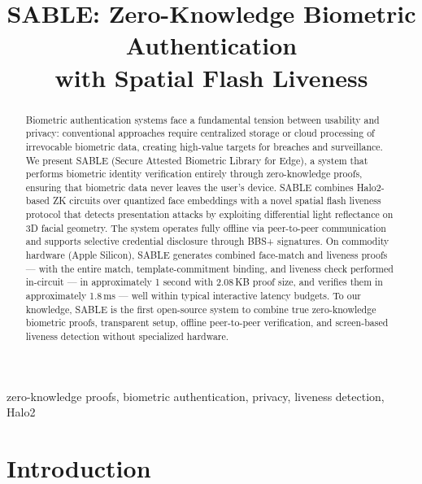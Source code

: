 \documentclass[conference]{IEEEtran}
\begin{document}
\title{SABLE: Zero-Knowledge Biometric Authentication\\with Spatial Flash Liveness}

\author{
}

\maketitle

\begin{abstract}
Biometric authentication systems face a fundamental tension between usability and privacy: conventional approaches require centralized storage or cloud processing of irrevocable biometric data, creating high-value targets for breaches and surveillance. We present SABLE (Secure Attested Biometric Library for Edge), a system that performs biometric identity verification entirely through zero-knowledge proofs, ensuring that biometric data never leaves the user's device. SABLE combines Halo2-based ZK circuits over quantized face embeddings with a novel spatial flash liveness protocol that detects presentation attacks by exploiting differential light reflectance on 3D facial geometry. The system operates fully offline via peer-to-peer communication and supports selective credential disclosure through BBS+ signatures. On commodity hardware (Apple Silicon), SABLE generates combined face-match and liveness proofs --- with the entire match, template-commitment binding, and liveness check performed in-circuit --- in approximately 1 second with 2.08\,KB proof size, and verifies them in approximately 1.8\,ms --- well within typical interactive latency budgets. To our knowledge, SABLE is the first open-source system to combine true zero-knowledge biometric proofs, transparent setup, offline peer-to-peer verification, and screen-based liveness detection without specialized hardware.
\end{abstract}

\begin{IEEEkeywords}
zero-knowledge proofs, biometric authentication, privacy, liveness detection, Halo2
\end{IEEEkeywords}

\section{Introduction}
\label{sec:introduction}
\end{document}
